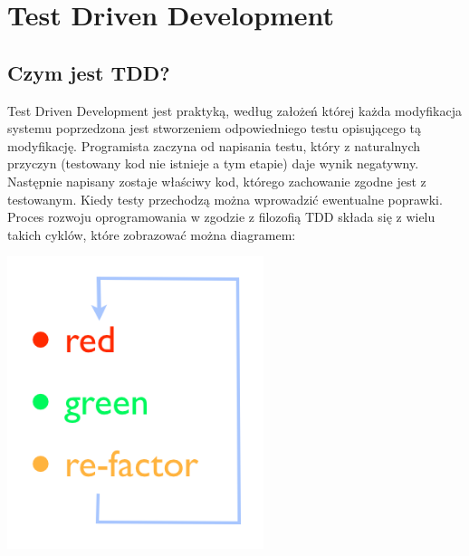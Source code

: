 
\chapter[Test Driven Development]{Test Driven Development}
  \section{Czym jest TDD?}
    Test Driven Development jest praktyką, według założeń której każda modyfikacja systemu poprzedzona jest stworzeniem odpowiedniego testu opisującego tą modyfikację. Programista zaczyna od napisania testu, który z naturalnych przyczyn (testowany kod nie istnieje a tym etapie) daje wynik negatywny. Następnie napisany zostaje właściwy kod, którego zachowanie zgodne jest z testowanym. Kiedy testy przechodzą można wprowadzić ewentualne poprawki.
    Proces rozwoju oprogramowania w zgodzie z filozofią TDD składa się z wielu takich cyklów, które zobrazować można diagramem:
    
    \includegraphics[width=75mm]{images/tdd_red_green_refactor.png}
    
